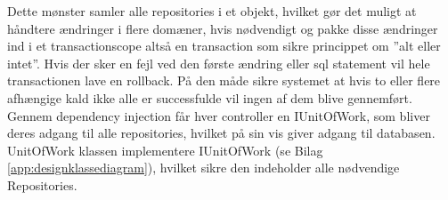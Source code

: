 Dette mønster samler alle repositories i et objekt, hvilket gør det muligt at håndtere ændringer i flere domæner, 
hvis nødvendigt og pakke disse ændringer ind i et transactionscope altså en transaction som sikre princippet om ”alt eller intet”. 
Hvis der sker en fejl ved den første ændring eller sql statement vil hele transactionen lave en rollback. På den måde sikre systemet 
at hvis to eller flere afhængige kald ikke alle er successfulde vil ingen af dem blive gennemført. \\

Gennem dependency injection får hver controller en IUnitOfWork, 
som bliver deres adgang til alle repositories, hvilket på sin vis giver adgang til databasen.\\

UnitOfWork klassen implementere IUnitOfWork (se Bilag \ref{app:designklassediagram}), 
hvilket sikre den indeholder alle nødvendige Repositories.